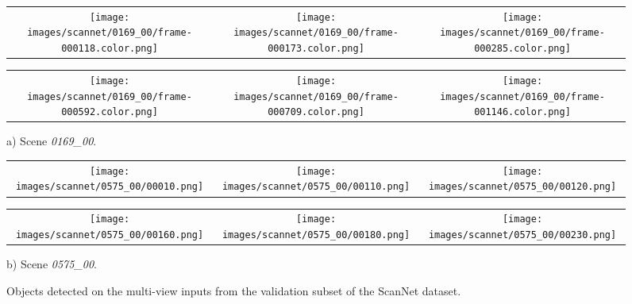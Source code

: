 \documentclass[10pt,twocolumn,letterpaper]{article}
\begin{document}
\begin{figure*}[!ht]
\centering
\setlength{\tabcolsep}{2pt}
\renewcommand{\arraystretch}{0.75}
\begin{tabular}{ccc}
    \texttt{[image: images/scannet/0169\_00/frame-000118.color.png]} &
    \texttt{[image: images/scannet/0169\_00/frame-000173.color.png]} &
    \texttt{[image: images/scannet/0169\_00/frame-000285.color.png]} \\
\end{tabular}
\begin{tabular}{ccc}
    \texttt{[image: images/scannet/0169\_00/frame-000592.color.png]} &
    \texttt{[image: images/scannet/0169\_00/frame-000709.color.png]} &
    \texttt{[image: images/scannet/0169\_00/frame-001146.color.png]} \\
\end{tabular}
a) Scene \textit{0169\_00}.
\\ \vspace{3pt}
\begin{tabular}{ccc}
    \texttt{[image: images/scannet/0575\_00/00010.png]} &
    \texttt{[image: images/scannet/0575\_00/00110.png]} &
    \texttt{[image: images/scannet/0575\_00/00120.png]} \\
\end{tabular}
\begin{tabular}{ccc}
    \texttt{[image: images/scannet/0575\_00/00160.png]} &
    \texttt{[image: images/scannet/0575\_00/00180.png]} &
    \texttt{[image: images/scannet/0575\_00/00230.png]} \\
\end{tabular}
b) Scene \textit{0575\_00}.
\caption{Objects detected on the multi-view inputs from the validation subset of the ScanNet dataset.}
\label{fig:vis_scannet}
\end{figure*}
\end{document}

